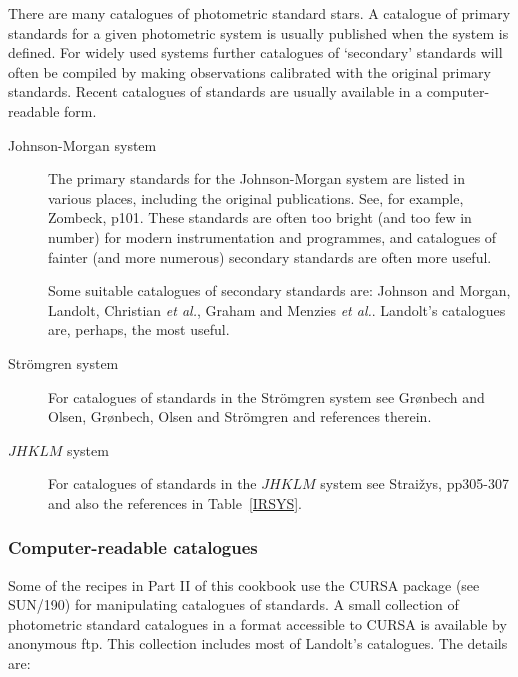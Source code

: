 \documentclass[twoside,11pt]{article}
\newcommand{\xref}[3]{#1}
\begin{document}
There are many catalogues of photometric standard stars.  A catalogue
of primary standards for a given photometric system is usually
published when the system is defined.  For widely used systems further
catalogues of `secondary' standards will often be compiled by making
observations calibrated with the original primary standards.  Recent
catalogues of standards are usually available in a computer-readable
form.

\begin{description}

  \item[Johnson-Morgan system] The primary standards for the Johnson-Morgan
   system are listed in various places, including the original publications.
   See, for example, Zombeck\cite{ZOMBECK90}, p101.  These standards are
   often too bright (and too few in number) for modern instrumentation and
   programmes, and catalogues of fainter (and more numerous) secondary
   standards are often more useful.

   Some suitable catalogues of secondary standards are:
   Johnson and Morgan\cite{JOHNSON53},
   Landolt\cite{LANDOLT73, LANDOLT83, LANDOLT83B, LANDOLT92},
   Christian {\it et al.}\/\cite{CHRISTIAN85},
   Graham\cite{GRAHAM82} and
   Menzies {\it et al.}\/\cite{MENZIES89, MENZIES91}.
   Landolt's catalogues are, perhaps, the most useful.


  \item[Str\"{o}mgren system] For catalogues of standards in the Str\"{o}mgren
   system see Gr\o nbech and Olsen\cite{GRONBECH77}, Gr\o nbech, Olsen and
   Str\"{o}mgren\cite{GRONBECH76} and references therein.

  \item[$JHKLM$ system] For catalogues of standards in the $JHKLM$
   system see Strai\v{z}ys\cite{STRAIZYS92}, pp305-307 and also the
   references in Table~\ref{IRSYS}.

\end{description}

\subsubsection{Computer-readable catalogues}

Some of the recipes in Part II of this cookbook use the CURSA package
(see \xref{SUN/190}{sun190}{}\cite{SUN190}) for manipulating
catalogues of standards.  A small collection of photometric standard
catalogues in a format accessible to CURSA is available by anonymous
ftp.  This collection includes most of Landolt's catalogues.  The
details are:
\end{document}
